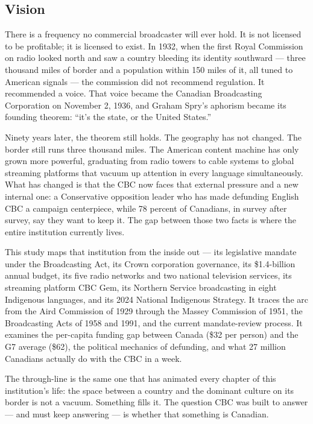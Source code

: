 \documentclass[11pt,letterpaper]{article}
\begin{document}
\subsection{Vision}

There is a frequency no commercial broadcaster will ever hold. It is not licensed to be profitable; it is licensed to exist. In 1932, when the first Royal Commission on radio looked north and saw a country bleeding its identity southward --- three thousand miles of border and a population within 150 miles of it, all tuned to American signals --- the commission did not recommend regulation. It recommended a voice. That voice became the Canadian Broadcasting Corporation on November 2, 1936, and Graham Spry's aphorism became its founding theorem: ``it's the state, or the United States.''

Ninety years later, the theorem still holds. The geography has not changed. The border still runs three thousand miles. The American content machine has only grown more powerful, graduating from radio towers to cable systems to global streaming platforms that vacuum up attention in every language simultaneously. What has changed is that the CBC now faces that external pressure and a new internal one: a Conservative opposition leader who has made defunding English CBC a campaign centerpiece, while 78 percent of Canadians, in survey after survey, say they want to keep it. The gap between those two facts is where the entire institution currently lives.

This study maps that institution from the inside out --- its legislative mandate under the Broadcasting Act, its Crown corporation governance, its \$1.4-billion annual budget, its five radio networks and two national television services, its streaming platform CBC Gem, its Northern Service broadcasting in eight Indigenous languages, and its 2024 National Indigenous Strategy. It traces the arc from the Aird Commission of 1929 through the Massey Commission of 1951, the Broadcasting Acts of 1958 and 1991, and the current mandate-review process. It examines the per-capita funding gap between Canada (\$32 per person) and the G7 average (\$62), the political mechanics of defunding, and what 27 million Canadians actually do with the CBC in a week.

The through-line is the same one that has animated every chapter of this institution's life: the space between a country and the dominant culture on its border is not a vacuum. Something fills it. The question CBC was built to answer --- and must keep answering --- is whether that something is Canadian.
\end{document}
